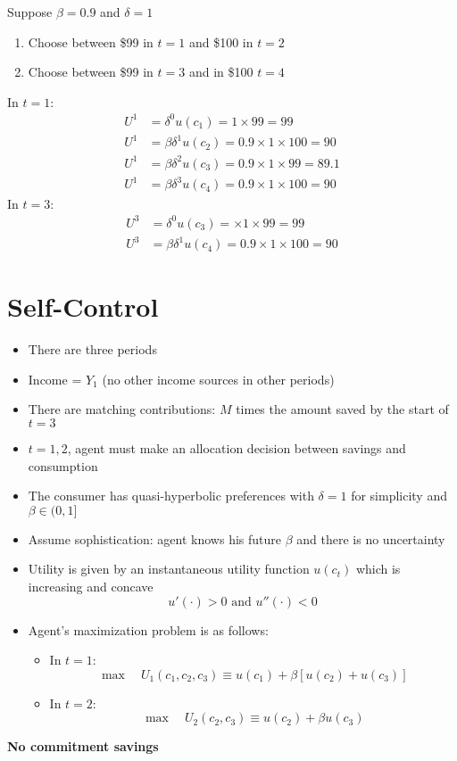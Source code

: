 \documentclass[a4paper]{article}
\begin{document}
Suppose $\beta=0.9$ and $\delta=1$
\begin{enumerate}
    \item Choose between \$99 in $t=1$ and \$100 in $t=2$
    \item Choose between \$99 in $t=3$ and in \$100 $t=4$
\end{enumerate}
In $t=1$:
\begin{align*}
    U^1&=\delta^{0}u(c_1)=1\times 99=99 \\
    U^1&=\beta\delta^{1}u(c_2)=0.9\times 1\times 100=90 \\
    U^1&=\beta\delta^{2}u(c_3)=0.9\times 1\times 99=89.1 \\
    U^1&=\beta\delta^{3}u(c_4)=0.9\times 1\times 100=90
\end{align*}
In $t=3$:
\begin{align*}
    U^3&=\delta^{0}u(c_3)=\times 1\times 99=99 \\
    U^3&=\beta\delta^{1}u(c_4)=0.9\times 1\times 100=90
\end{align*}

\section{Self-Control}
\begin{itemize}
    \item There are three periods
    \item Income = $Y_1$ (no other income sources in other periods)
    \item There are matching contributions: $M$ times the amount saved by the start of $t=3$
    \item $t=1, 2$, agent must make an allocation decision between savings and consumption
    \item The consumer has quasi-hyperbolic preferences with $\delta=1$ for simplicity and $\beta\in(0,1]$
    \item Assume sophistication: agent knows his future $\beta$ and there is no uncertainty
    \item Utility is given by an instantaneous utility function $u(c_t)$ which is increasing and concave
    \[u'(\cdot)>0 \textrm{ and } u''(\cdot)<0 \]
    \item Agent's maximization problem is as follows:
    \begin{itemize}
        \item In $t=1$:
        \[\max\quad U_1(c_1,c_2,c_3)\equiv u(c_1)+\beta[u(c_2)+u(c_3) ] \]
        \item In $t=2$:
        \[\max\quad U_2(c_2,c_3)\equiv u(c_2)+\beta u(c_3) \]
    \end{itemize}
\end{itemize}
\textbf{No commitment savings}
\end{document}
